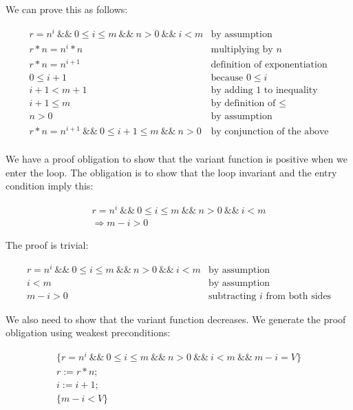 \documentclass[11pt]{article}
\begin{document}
    We can prove this as follows:

    \[
        \begin{array}{ll}
            r=n^i ~\&\&~ 0 \le i \le m ~\&\&~ n > 0 ~\&\&~ i < m & \mbox{by assumption}\\
            r*n=n^i*n & \mbox{multiplying by $n$}\\
            r*n=n^{i+1} & \mbox{definition of exponentiation}\\
            0 \le i+1 & \mbox{because $0 \le i$}\\
            i+1 < m+1 & \mbox{by adding 1 to inequality}\\
            i+1 \le m & \mbox{by definition of $\le$}\\
            n>0 & \mbox{by assumption}\\
            r*n=n^{i+1} ~\&\&~ 0 \le i+1 \le m ~\&\&~ n > 0& \mbox{by conjunction of the above}\\
        \end{array}
    \]

    We have a proof obligation to show that the variant function is
    positive when we enter the loop. The obligation is to show that the loop
    invariant and the entry condition imply this:

    \[
        \begin{array}{l}
            r=n^i ~\&\&~ 0 \le i \le m ~\&\&~ n > 0 ~\&\&~ i < m\\
            \Rightarrow m-i>0
        \end{array}
    \]

    The proof is trivial:

    \[
        \begin{array}{ll}
            r=n^i ~\&\&~ 0 \le i \le m ~\&\&~ n > 0 ~\&\&~ i < m & \mbox{by assumption}\\
            i < m & \mbox{by assumption}\\
            m-i > 0 & \mbox{subtracting $i$ from both sides}
        \end{array}
    \]

    We also need to show that the variant function decreases. We generate
    the proof obligation using weakest preconditions:

    \[
        \begin{array}{l}
            \{ r=n^i ~\&\&~ 0 \le i \le m ~\&\&~ n > 0 ~\&\&~ i < m ~\&\&~ m-i = V \}\\
            r := r*n;\\
            i := i+1;\\
            \{ m-i < V\}
        \end{array}
    \]
\end{document}

